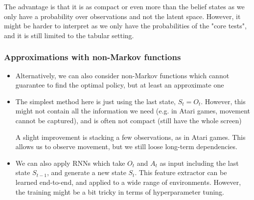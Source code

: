 \begin{itemize}
	The advantage is that it is as compact or even more than the belief states as we only have a probability over observations and not the latent space. However, it might be harder to interpret as we only have the probabilities of the "core tests", and it is still limited to the tabular setting.
\end{itemize}
\subsubsection{Approximations with non-Markov functions}
\begin{itemize}
	\item Alternatively, we can also consider non-Markov functions which cannot guarantee to find the optimal policy, but at least an approximate one
	\item The simplest method here is just using the last state, $S_t=O_t$. However, this might not contain all the information we need (e.g. in Atari games, movement cannot be captured), and is often not compact (still have the whole screen)
	
	A slight improvement is stacking a few observations, as in Atari games. This allows us to observe movement, but we still loose long-term dependencies.
	\item We can also apply RNNs which take $O_t$ and $A_t$ as input including the last state $S_{t-1}$, and generate a new state $S_t$. This feature extractor can be learned end-to-end, and applied to a wide range of environments. However, the training might be a bit tricky in terms of hyperparameter tuning. 
\end{itemize}

